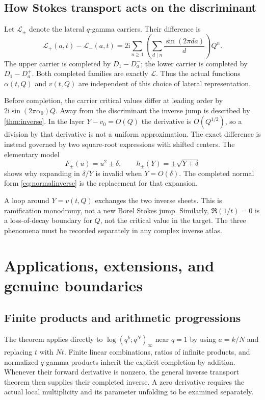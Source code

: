 \documentclass[11pt,a4paper]{article}
\numberwithin{equation}{section}
\theoremstyle{definition}
\theoremstyle{remark}
\newcommand{\ii}{\mathrm i}
\newcommand{\cL}{\mathcal L}
\begin{document}
\subsection{How Stokes transport acts on the discriminant}
Let $\cL_\pm$ denote the lateral $q$-gamma carriers. Their difference is
\begin{equation}
 \cL_+(a,t)-\cL_-(a,t)
 =2\ii\sum_{n\geq1}
       \left(\sum_{d\mid n}\frac{\sin(2\pi da)}d\right)Q^n.
 \label{eq:qgammajump}
\end{equation}
The upper carrier is completed by $D_1-D_a^-$; the lower carrier is
completed by $D_1-D_a^+$. Both completed families are exactly
$\cL$. Thus the actual functions $\alpha(t,Q)$ and $v(t,Q)$ are
independent of this choice of lateral representation.

Before completion, the carrier critical values differ at leading
order by $2\ii\sin(2\pi\alpha_0)Q$. Away from the discriminant the
inverse jump is described by \cref{thm:inverse}. In the layer
$Y-v_0=O(Q)$ the derivative is $O(Q^{1/2})$, so a division by that
derivative is not a uniform approximation. The exact difference is
instead governed by two square-root expressions with shifted centers.
The elementary model
\[
 F_\pm(u)=u^2\pm\delta,\qquad
 h_\pm(Y)=\pm\sqrt{Y\mp\delta}
\]
shows why expanding in $\delta/Y$ is invalid when $Y=O(\delta)$.
The completed normal form \eqref{eq:normalinverse} is the replacement
for that expansion.

A loop around $Y=v(t,Q)$ exchanges the two inverse sheets. This is
ramification monodromy, not a new Borel Stokes jump. Similarly,
$\Re(1/t)=0$ is a loss-of-decay boundary for $Q$, not the critical
value in the target. The three phenomena must be recorded separately
in any complex inverse atlas.

\section{Applications, extensions, and genuine boundaries}
\label{sec:scope}

\subsection{Finite products and arithmetic progressions}
The theorem applies directly to
$\log(q^k;q^N)_\infty$ near $q=1$ by using $a=k/N$ and replacing $t$
with $Nt$. Finite linear combinations, ratios of infinite products,
and normalized $q$-gamma products inherit the explicit completion by
addition. Whenever their forward derivative is nonzero, the general
inverse transport theorem then supplies their completed inverse. A
zero derivative requires the actual local multiplicity and its
parameter unfolding to be examined separately.
\end{document}
